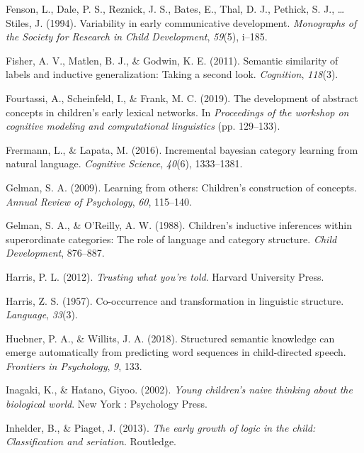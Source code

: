 \documentclass[english,,man,floatsintext]{apa6}
\begin{document}
\leavevmode\hypertarget{ref-fenson94}{}%
Fenson, L., Dale, P. S., Reznick, J. S., Bates, E., Thal, D. J., Pethick, S. J., \ldots{} Stiles, J. (1994). Variability in early communicative development. \emph{Monographs of the Society for Research in Child Development}, \emph{59}(5), i--185.

\leavevmode\hypertarget{ref-fisher2011}{}%
Fisher, A. V., Matlen, B. J., \& Godwin, K. E. (2011). Semantic similarity of labels and inductive generalization: Taking a second look. \emph{Cognition}, \emph{118}(3).

\leavevmode\hypertarget{ref-fourtassi2019}{}%
Fourtassi, A., Scheinfeld, I., \& Frank, M. C. (2019). The development of abstract concepts in children's early lexical networks. In \emph{Proceedings of the workshop on cognitive modeling and computational linguistics} (pp. 129--133).

\leavevmode\hypertarget{ref-frermann2016}{}%
Frermann, L., \& Lapata, M. (2016). Incremental bayesian category learning from natural language. \emph{Cognitive Science}, \emph{40}(6), 1333--1381.

\leavevmode\hypertarget{ref-gelman2009}{}%
Gelman, S. A. (2009). Learning from others: Children's construction of concepts. \emph{Annual Review of Psychology}, \emph{60}, 115--140.

\leavevmode\hypertarget{ref-gelman1988}{}%
Gelman, S. A., \& O'Reilly, A. W. (1988). Children's inductive inferences within superordinate categories: The role of language and category structure. \emph{Child Development}, 876--887.

\leavevmode\hypertarget{ref-harris2012}{}%
Harris, P. L. (2012). \emph{Trusting what you're told}. Harvard University Press.

\leavevmode\hypertarget{ref-harris1957}{}%
Harris, Z. S. (1957). Co-occurrence and transformation in linguistic structure. \emph{Language}, \emph{33}(3).

\leavevmode\hypertarget{ref-huebner2018}{}%
Huebner, P. A., \& Willits, J. A. (2018). Structured semantic knowledge can emerge automatically from predicting word sequences in child-directed speech. \emph{Frontiers in Psychology}, \emph{9}, 133.

\leavevmode\hypertarget{ref-inagaki2002}{}%
Inagaki, K., \& Hatano, Giyoo. (2002). \emph{Young children's naive thinking about the biological world}. New York : Psychology Press.

\leavevmode\hypertarget{ref-inhelder2013}{}%
Inhelder, B., \& Piaget, J. (2013). \emph{The early growth of logic in the child: Classification and seriation}. Routledge.
\end{document}
